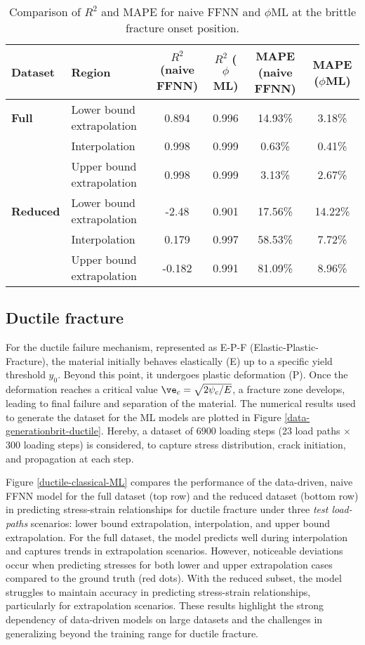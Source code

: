 \documentclass[final,3p,times]{elsarticle}
\begin{document}
%
\begin{table}[!t]
    \centering
    \renewcommand{\arraystretch}{1.2}
    \begin{tabular}{l l c c c c}
        \toprule
        \textbf{Dataset} & \textbf{Region} & $R^2$ (naive FFNN) & $R^2$ ($\phi$ML) & MAPE (naive FFNN) & MAPE ($\phi$ML) \\
        \midrule
        \textbf{Full} & Lower bound extrapolation & 0.894 & 0.996 & 14.93\% & 3.18\% \\
        & Interpolation & 0.998 & 0.999 & 0.63\% & 0.41\% \\
        & Upper bound extrapolation & 0.998 & 0.999 & 3.13\% & 2.67\% \\
        \midrule
        \textbf{Reduced} & Lower bound extrapolation & -2.48 & 0.901 & 17.56\% & 14.22\% \\
        & Interpolation & 0.179 & 0.997 & 58.53\% & 7.72\% \\
        & Upper bound extrapolation & -0.182 & 0.991 & 81.09\% & 8.96\% \\
        \bottomrule
    \end{tabular}
    \caption{Comparison of $R^2$ and MAPE for naive FFNN and $\phi$ML at the brittle fracture onset position.}
    \label{tab:comparison-brit}
\end{table}

\subsection{Ductile fracture}
For the ductile failure mechanism, represented as E-P-F (Elastic-Plastic-Fracture), the material initially behaves elastically (E) up to a specific yield threshold $y_0$. Beyond this point, it undergoes plastic deformation (P). Once the deformation reaches a critical value $\ve_c = \sqrt{2\psi_c/E}$, a fracture zone develops, leading to final failure and separation of the material. The numerical results used to generate the dataset for the ML models are plotted in Figure \ref{data-generationbrit-ductile}. Hereby, a dataset of 6900 loading steps (23 load paths $\times$ 300 loading steps) is considered, to capture stress distribution, crack initiation, and propagation at each step.


Figure \ref{ductile-classical-ML} compares the performance of the data-driven, naive FFNN model for the full dataset (top row) and the reduced dataset (bottom row) in predicting stress-strain relationships for ductile fracture under three {\it test load-paths} scenarios: lower bound extrapolation, interpolation, and upper bound extrapolation. For the full dataset, the model predicts well during interpolation and captures trends in extrapolation scenarios. However, noticeable deviations occur when predicting stresses for both lower and upper extrapolation cases compared to the ground truth (red dots). With the reduced subset, the model struggles to maintain accuracy in predicting stress-strain relationships, particularly for extrapolation scenarios. These results highlight the strong dependency of data-driven models on large datasets and the challenges in generalizing beyond the training range for ductile fracture.
\end{document}
